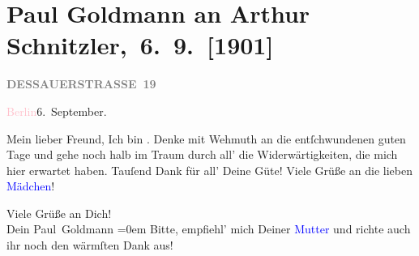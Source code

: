 

\renewcommand{\erwaehntePersonen}{Personen: Olga Schnitzler, Louise Schnitzler, Elisabeth Steinrück}
\renewcommand{\erwaehnteOrte}{Orte: Berlin, Dessauer Straße, Wien}
\renewcommand{\erwaehnteWerke}{}
\section[ Paul Goldmann an Arthur Schnitzler, 6. 9. {[}1901{]}]{Paul Goldmann an Arthur Schnitzler, 6. 9. {[}1901{]}}
\nopagebreak{}
\rehead{ }\normalsize\beginnumbering{}
\toendnotes[C]{\smallbreak\pagebreak[2]}
\toendnotes[C]{\smallbreak}
\pstart
           \noindent{}\raggedleft{}{\pb}\textcolor{pink}{\textcolor{gray}{\textbf{DESSAUERSTRASSE 19}}}{}\ledrightnote{\textcolor{pink}{Dessauer Straße}}\pend
           
\pstart
           \textcolor{pink}{Berlin}{}\ledrightnote{\textcolor{pink}{Berlin}}{ }6. September.\pend
           
\pstart\center{}Mein lieber Freund,\pend
\pstart
           Ich bin \label{K_L03081-2v}\label{K_L03081-2h}. Denke mit Wehmuth an die
               entſchwundenen guten Tage und gehe noch halb im Traum durch all’ die
               Widerwärtigkeiten, die mich hier erwartet haben. Tauſend Dank für all’ Deine Güte!
               Viele Grüße an die lieben \textcolor{blue}{Mädchen}{}\ledrightnote{{$\rightarrow$}\textcolor{blue}{Olga Schnitzler}{\newline}{$\rightarrow$}\textcolor{blue}{Elisabeth Steinrück}}!\pend
           
\pstart
           Viele Grüße an Dich! {\\[\baselineskip]}Dein \spacefill\mbox{Paul Goldmann}\pend
           \leftskip=0em{}
\pstart
           \noindent{}Bitte, empfiehl’ mich Deiner \textcolor{blue}{Mutter}{}\ledrightnote{{$\rightarrow$}\textcolor{blue}{Louise Schnitzler}} und richte auch ihr noch den wärmſten Dank aus!\pend
           \endnumbering{}
\begin{anhang}
\end{anhang}
      